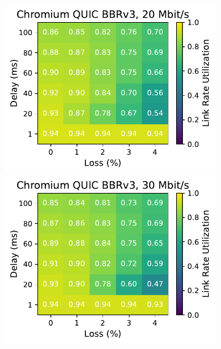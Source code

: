 \begin{figure}[ht]
\begin{subfigure}[b]{0.22\linewidth}
        \includegraphics[width=\linewidth,trim={0 0 2cm 0},clip]{splitting-paper/figures/heatmaps/heatmap_quic_bbr3_20mbps.pdf}
        \includegraphics[width=\linewidth,trim={0 0 2cm 0},clip]{splitting-paper/figures/heatmaps/heatmap_quic_bbr3_30mbps.pdf}

\end{subfigure}
\end{figure}
